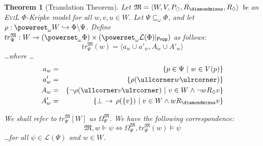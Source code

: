 \documentclass[11pt]{article}
\newtheorem{theorem}{Theorem}
\newcommand{\bs}{\ensuremath{\backslash}}
\newcommand{\ra}{\rangle}
\newcommand{\la}{\langle}
\newcommand{\DD}{\diamondminus}
\newcommand{\Pos}{\Diamond}
\newcommand{\lc}{\ullcorner}
\newcommand{\rc}{\ulrcorner}
\begin{document}
 \begin{theorem}[Translation Theorem]
 Let $\mathfrak{M} = \la W, V, P_\circlearrowleft, R_{\DD}, R_{\Pos} \ra$ be an \textsc{EviL} $\Phi$-Kripke model
 for all $w,v,u \in W$.  Let $\Psi \subseteq_\omega \Phi$, and let $\rho : \powerset_\omega W \hookrightarrow \Phi \bs \Psi$.  Define $tr_{\Psi}^\mathfrak{M}: W \to (\powerset_\omega \Phi) \times (\powerset_\omega \mathcal{L}(\Phi)|_{\mathsf{Prop}})$ as follows:
 \[ tr_{\Psi}^\mathfrak{M}(w) =  \la  a_w \cup a'_w, A_w \cup A'_w \ra\]
\ldots where \ldots
 \begin{eqnarray*}
 a_w & = & \{ p \in \Psi \ |\  w \in V(p) \}\\
 a'_w & = & \{ \rho(\lc w\rc) \} \\
 A_w & = & \{ \neg \rho(\lc v\rc) \ | \ v \in W \wedge \neg w R_\Pos v \}\\
 A'_w & = & \{ \bot \IMPL \rho(\{v\})\ | \ v \in W \wedge w R_\DD v \}
\end{eqnarray*}

We shall refer to $tr_{\Psi}^\mathfrak{M}[W]$ as $\Omega_{\Psi}^\mathfrak{M}$.  We have the following correspondence:
 \[ \mathfrak{M},w \Vdash \psi \iff \Omega_{\Psi}^\mathfrak{M},tr_{\Psi}^\mathfrak{M}(w) \models \psi \] 
\ldots for all $\psi \in \mathcal{L}(\Psi)$ and $w \in W$.
 \end{theorem}
\end{document}
